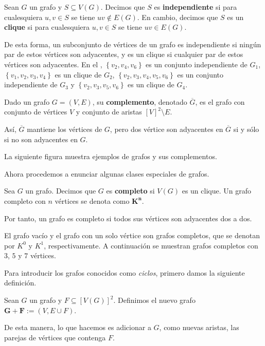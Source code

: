 \begin{Def}
   Sean $G$ un grafo y $S\subseteq V(G)$. Decimos que $S$ es \textbf{independiente} si para cualesquiera $u,v\in S$ se tiene $uv\notin E(G)$. En cambio, decimos que $S$ es un \textbf{clique} si para cualesquiera $u,v\in S$ se tiene $uv\in E(G)$.
\end{Def}
De esta forma, un subconjunto de vértices de un grafo es independiente si ningún par de estos vértices son adyacentes, y es un clique si cualquier par de estos vértices son adyacentes. En el , $\left\lbrace v_2,v_4,v_6\right\rbrace$ es un conjunto independiente de $G_1$, $\left\lbrace v_1,v_2,v_3,v_4\right\rbrace$ es un clique de $G_2$, $\left\lbrace v_2,v_3,v_4,v_5,v_6\right\rbrace$ es un conjunto independiente de $G_3$ y $\left\lbrace v_2,v_3,v_5,v_6\right\rbrace$ es un clique de $G_4$.
\begin{Def}
   Dado un grafo $G=(V,E)$, su \textbf{complemento}, denotado $\overline{G}$, es el grafo con conjunto de vértices $V$ y conjunto de aristas $[V]^2\setminus E$. 
\end{Def}
Así, $\overline{G}$ mantiene los vértices de $G$, pero dos vértice son adyacentes en $\overline{G}$ si y sólo si no son adyacentes en $G$.
\begin{Ejm}
   La siguiente figura muestra ejemplos de grafos y sus complementos.\clearpage
   
\end{Ejm}
Ahora procedemos a enunciar algunas clases especiales de grafos.
\begin{Def}
   Sea $G$ un grafo. Decimos que $G$ es \textbf{completo} si $V(G)$ es un clique. Un grafo completo con $n$ vértices se denota como $\bm{K^n}$.
\end{Def}
Por tanto, un grafo es completo si todos sus vértices son adyacentes dos a dos.
\begin{Ejm}
   El grafo vacío y el grafo con un solo vértice son grafos completos, que se denotan por $K^0$ y $K^1$, respectivamente. A continuación se muestran grafos completos con $3$, $5$ y $7$ vértices.
   
\end{Ejm}
Para introducir los grafos conocidos como \textit{ciclos}, primero damos la siguiente definición.
\begin{Def}
   Sean $G$ un grafo y $F\subseteq [V(G)]^2$. Definimos el nuevo grafo $\bm{G+F}:=(V,E\cup F)$.
\end{Def}
De esta manera, lo que hacemos es adicionar a $G$, como nuevas aristas, las parejas de vértices que contenga $F$.
